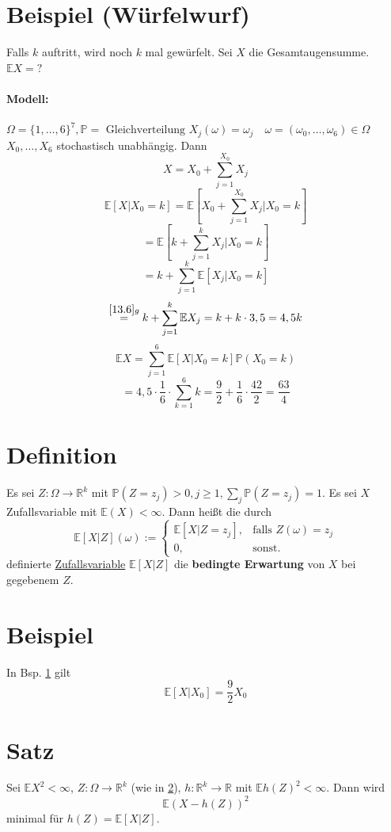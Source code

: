 \documentclass[a4paper,11pt,notitlepage]{report}
\newcommand{\R}{{\ensuremath{\mathbb{R}}}}
\newcommand{\Prim}{{\ensuremath{\mathbb{P}}}}
\newcommand{\E}{{\ensuremath{\mathbb{E}}}}
\begin{document}
\newpage

\section{Beispiel (Würfelwurf)}
\label{13.8}
Falls $k$ auftritt, wird noch $k$ mal gewürfelt.
\newline
Sei $X$ die Gesamtaugensumme.
\newline
$\E X = ?$
\paragraph{Modell:} $\Omega = \{1,\ldots,6\}^7, \Prim = \text{ Gleichverteilung}$
\newline
$X_j(\omega) = \omega_j \quad \omega = (\omega_0, \ldots, \omega_6) \in \Omega$
\newline
$X_0, \ldots, X_6$ stochastisch unabhängig. Dann
$$X = X_0 + \sum\limits_{j=1}^{X_0}{X_j}$$ 
$$\E [X | X_0 = k] = \E [X_0 + \sum\limits_{j=1}^{X_0}{X_j}|X_0 =k]$$
$$= \E [k + \sum\limits_{j=1}^k{X_j} | X_0 = k]$$
$$= k + \sum\limits_{j=1}^k{\E [X_j | X_0 = k]}$$
$$\overset{\ref{13.6} g}{=} k + \sum\limits_{j=1}^k{\E X_j} = k + k \cdot 3,5 = 4,5 k$$
$$\E X = \sum\limits_{j=1}^6{\E [X | X_0 = k] \Prim(X_0 = k)}$$
$$= 4,5 \cdot \frac{1}{6} \cdot \sum\limits_{k=1}^6{k} = \frac{9}{2} + \frac{1}{6} \cdot \frac{42}{2} = \frac{63}{4}$$

\section{Definition}
\label{13.9}
Es sei $Z \colon \Omega \rightarrow \R^k$ mit $\Prim(Z=z_j)>0, j \geq 1, \sum\limits_j{\Prim(Z=z_j)}=1$.
\newline
Es sei $X$ Zufallsvariable mit $\E(X)< \infty$. Dann heißt die durch
$$\E [X|Z](\omega) := \begin{cases} \E [X| Z = z_j], & \text{falls } Z(\omega) = z_j \\ 0, & \text{sonst.} \end{cases}$$
definierte \underline{Zufallsvariable} $\E[X|Z]$ die \textbf{bedingte Erwartung} von $X$ bei gegebenem $Z$.

\section{Beispiel}
In Bsp. \ref{13.8} gilt
$$\E [X|X_0] = \frac{9}{2} X_0$$

\section{Satz}
Sei $\E X^2 < \infty$, $Z \colon \Omega \rightarrow \R^k$ (wie in \ref{13.9}), $h \colon \R^k \rightarrow \R$ mit $\E h(Z)^2 < \infty$. Dann wird 
$$\E (X - h(Z))^2$$
minimal für $h(Z) = \E [X|Z]$.
\end{document}
